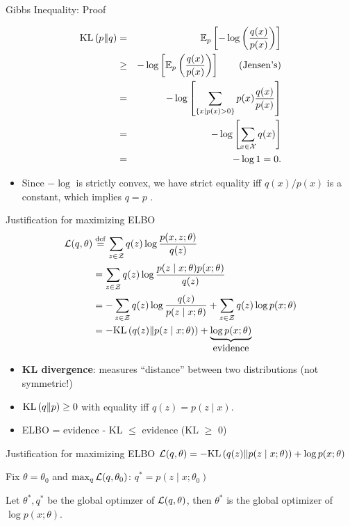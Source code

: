 \documentclass[usenames,dvipsnames,notes,11pt,aspectratio=169]{beamer}
\newcommand{\pdfnote}[1]{}
\begin{document}
\begin{frame}{Gibbs Inequality: Proof}

\begin{eqnarray*}
\text{KL}\left( p \| q \right) & = & \mathbb{E}_{p}\left[-\log\left(\frac{q(x)}{p(x)}\right)\right]\\
 & \ge & -\log\left[\mathbb{E}_{p}\left(\frac{q(x)}{p(x)}\right)\right]\mbox{\qquad\text{(Jensen's)}}\\
 & = & -\log\left[\sum_{\left\{ x\mid p(x)>0\right\} }p(x)\frac{q(x)}{p(x)}\right]\\
 & = & -\log\left[\sum_{x\in\mathcal{X}}q(x)\right]\\
 & = & -\log1=0.
\end{eqnarray*}


\begin{itemize}
\item Since $-\log$ is strictly convex, we have strict equality iff $q(x)/p(x)$
is a constant, which implies $q=p$ . 
\end{itemize}
\end{frame}

\begin{frame}
    {Justification for maximizing ELBO}
    \begin{align*}
        \mathcal{L}(q, \theta) &\stackrel{\rm def}{=} \sum_{z\in\mathcal{Z}} q(z) \log \frac{p(x,z;\theta)}{q(z)} \\
        &= \sum_{z\in\mathcal{Z}} q(z)\log \frac{p(z\mid x;\theta)p(x;\theta)}{q(z)} \\
        &= -\sum_{z\in\mathcal{Z}}q(z) \log \frac{q(z)}{p(z\mid x;\theta)}
        + \sum_{z\in\mathcal{Z}} q(z) \log p(x;\theta) \\
        &= -\text{KL}\left( q(z) \| p(z\mid x;\theta) \right) + \underbrace{\log p(x;\theta)}_{\textstyle\text{evidence}}
    \end{align*}
    \vspace{-2em}
    \begin{itemize}
        \item \textbf{KL divergence}: measures ``distance'' between two distributions (not symmetric!)
        \item $\text{KL}\left( q \| p \right)\ge 0$ with equality iff $q(z) = p(z\mid x)$.
        \item ELBO = evidence - KL $\le$ evidence (KL $\ge$ 0)
    \end{itemize}
    \pdfnote{q(z) is the our guesses of the latent variable. If the guess is close, then we are good.}
\end{frame}

\begin{frame}
    {Justification for maximizing ELBO}
    $
    \mathcal{L}(q, \theta) = -\text{KL}\left( q(z) \| p(z\mid x;\theta) \right) + \log p(x;\theta)
    $

    Fix $\theta=\theta_0$ and $\max_q \mathcal{L}(q, \theta_0)$: $q^* = p(z\mid x;\theta_0)$ 
    \vspace{10em}

    Let $\theta^*, q^*$ be the global optimzer of $\mathcal{L}(q, \theta)$, then $\theta^*$ is the global optimizer of $\log p(x;\theta)$. %
\end{frame}
\end{document}
